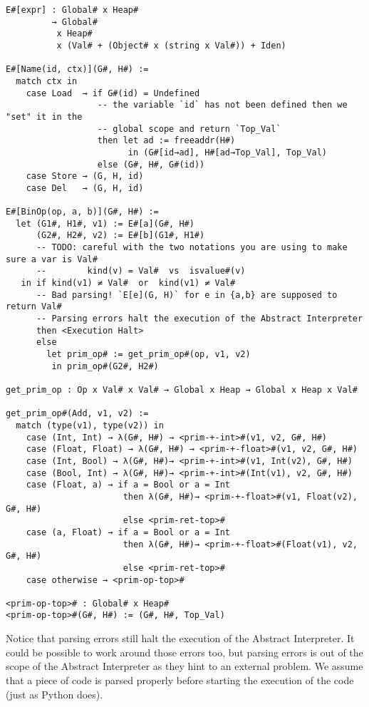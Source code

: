 \begin{verbatim}
E#[expr] : Global# x Heap#
         → Global#
          x Heap#
          x (Val# + (Object# x (string x Val#)) + Iden)

E#[Name(id, ctx)](G#, H#) :=
  match ctx in
    case Load  → if G#(id) = Undefined
                  -- the variable `id` has not been defined then we "set" it in the
                  -- global scope and return `Top_Val`
                  then let ad := freeaddr(H#)
                        in (G#[id→ad], H#[ad→Top_Val], Top_Val)
                  else (G#, H#, G#(id))
    case Store → (G, H, id)
    case Del   → (G, H, id)

E#[BinOp(op, a, b)](G#, H#) :=
  let (G1#, H1#, v1) := E#[a](G#, H#)
      (G2#, H2#, v2) := E#[b](G1#, H1#)
      -- TODO: careful with the two notations you are using to make sure a var is Val#
      --        kind(v) = Val#  vs  isvalue#(v)
   in if kind(v1) ≠ Val#  or  kind(v1) ≠ Val#
      -- Bad parsing! `E[e](G, H)` for e in {a,b} are supposed to return Val#
      -- Parsing errors halt the execution of the Abstract Interpreter
      then <Execution Halt>
      else
        let prim_op# := get_prim_op#(op, v1, v2)
         in prim_op#(G2#, H2#)

get_prim_op : Op x Val# x Val# → Global x Heap → Global x Heap x Val#

get_prim_op#(Add, v1, v2) :=
  match (type(v1), type(v2)) in
    case (Int, Int) → λ(G#, H#) → <prim-+-int>#(v1, v2, G#, H#)
    case (Float, Float) → λ(G#, H#) → <prim-+-float>#(v1, v2, G#, H#)
    case (Int, Bool) → λ(G#, H#)→ <prim-+-int>#(v1, Int(v2), G#, H#)
    case (Bool, Int) → λ(G#, H#)→ <prim-+-int>#(Int(v1), v2, G#, H#)
    case (Float, a) → if a = Bool or a = Int
                       then λ(G#, H#)→ <prim-+-float>#(v1, Float(v2), G#, H#)
                       else <prim-ret-top>#
    case (a, Float) → if a = Bool or a = Int
                       then λ(G#, H#)→ <prim-+-float>#(Float(v1), v2, G#, H#)
                       else <prim-ret-top>#
    case otherwise → <prim-op-top>#

<prim-op-top># : Global# x Heap#
<prim-op-top>#(G#, H#) := (G#, H#, Top_Val)
\end{verbatim}

Notice that parsing errors still halt the execution of the Abstract
Interpreter. It could be possible to work around those errors too, but
parsing errors is out of the scope of the Abstract Interpreter as they hint
to an external problem. We assume that a piece of code is parsed
properly before starting the execution of the code (just as Python
does).

